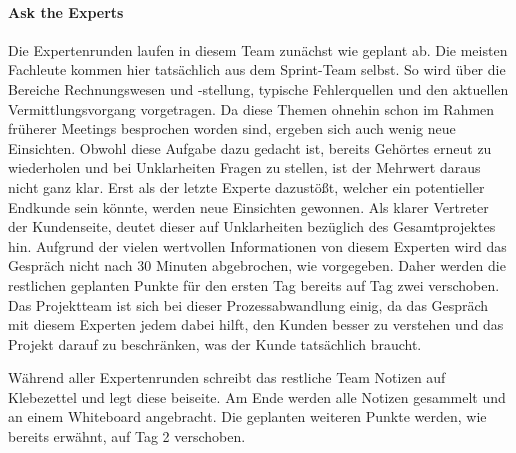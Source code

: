 \paragraph{Ask the Experts}
Die Expertenrunden laufen in diesem Team zunächst wie geplant ab. Die meisten Fachleute kommen hier tatsächlich aus dem Sprint-Team selbst. So wird über die Bereiche Rechnungswesen und -stellung, typische Fehlerquellen und den aktuellen Vermittlungsvorgang vorgetragen. Da diese Themen ohnehin schon im Rahmen früherer Meetings besprochen worden sind, ergeben sich auch wenig neue Einsichten. Obwohl diese Aufgabe dazu gedacht ist, bereits Gehörtes erneut zu wiederholen und bei Unklarheiten Fragen zu stellen, ist der Mehrwert daraus nicht ganz klar. Erst als der letzte Experte dazustößt, welcher ein potentieller Endkunde sein könnte, werden neue Einsichten gewonnen. Als klarer Vertreter der Kundenseite, deutet dieser auf Unklarheiten bezüglich des Gesamtprojektes hin. Aufgrund der vielen wertvollen Informationen von diesem Experten wird das Gespräch nicht nach 30 Minuten abgebrochen, wie vorgegeben. Daher werden die restlichen geplanten Punkte für den ersten Tag bereits auf Tag zwei verschoben. Das Projektteam ist sich bei dieser Prozessabwandlung einig, da das Gespräch mit diesem Experten jedem dabei hilft, den Kunden besser zu verstehen und das Projekt darauf zu beschränken, was der Kunde tatsächlich braucht.

Während aller Expertenrunden schreibt das restliche Team Notizen auf Klebezettel und legt diese beiseite. Am Ende werden alle Notizen gesammelt und an einem Whiteboard angebracht. Die geplanten weiteren Punkte werden, wie bereits erwähnt, auf Tag 2 verschoben.
%
%
%
%
%
%

